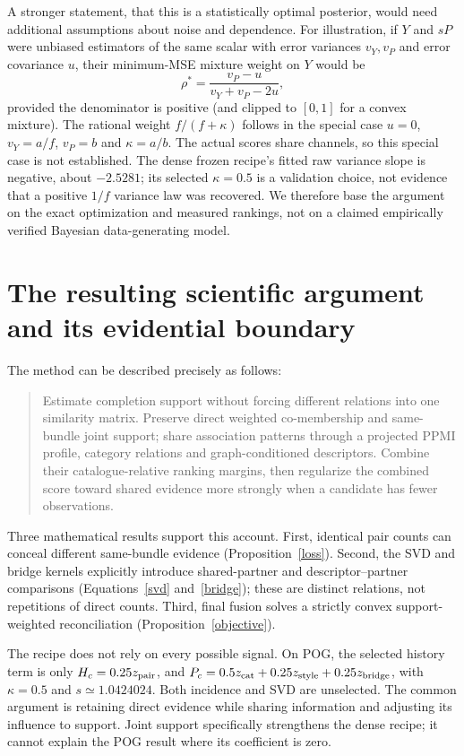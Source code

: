 \documentclass[11pt,a4paper]{article}
\begin{document}
A stronger statement, that this is a statistically optimal posterior, would need
additional assumptions about noise and dependence. For illustration, if $Y$ and
$sP$ were unbiased estimators of the same scalar with error variances $v_Y,v_P$
and error covariance $u$, their minimum-MSE mixture weight on $Y$ would be
\begin{equation}
 \rho^*=\frac{v_P-u}{v_Y+v_P-2u},
\end{equation}
provided the denominator is positive (and clipped to $[0,1]$ for a convex mixture).
The rational weight $f/(f+\kappa)$ follows in the special case $u=0$,
$v_Y=a/f$, $v_P=b$ and $\kappa=a/b$. The actual scores share channels, so this
special case is not established. The dense frozen recipe's fitted raw variance
slope is negative, about $-2.5281$; its selected $\kappa=0.5$ is a validation
choice, not evidence that a positive $1/f$ variance law was recovered. We therefore
base the argument on the exact optimization and measured rankings, not on a
claimed empirically verified Bayesian data-generating model.

\section{The resulting scientific argument and its evidential boundary}
The method can be described precisely as follows:
\begin{quote}
Estimate completion support without forcing different relations into one
similarity matrix. Preserve direct weighted co-membership and same-bundle joint
support; share association patterns through a projected PPMI profile, category
relations and graph-conditioned descriptors. Combine their catalogue-relative
ranking margins, then regularize the combined score toward shared evidence more
strongly when a candidate has fewer observations.
\end{quote}
Three mathematical results support this account. First, identical pair counts can
conceal different same-bundle evidence (Proposition~\ref{loss}). Second, the SVD
and bridge kernels explicitly introduce shared-partner and descriptor--partner
comparisons (Equations~\eqref{svd} and~\eqref{bridge}); these are distinct relations,
not repetitions of direct counts. Third, final fusion solves a strictly convex
support-weighted reconciliation (Proposition~\ref{objective}).

The recipe does not rely on every possible signal. On POG, the selected history
term is only $H_c=0.25z_{\rm pair}$, and
$P_c=0.5z_{\rm cat}+0.25z_{\rm style}+0.25z_{\rm bridge}$, with
$\kappa=0.5$ and $s\simeq1.0424024$. Both incidence and SVD are unselected.
The common argument is retaining direct evidence while sharing information and
adjusting its influence to support. Joint support specifically strengthens the
dense recipe; it cannot explain the POG result where its coefficient is zero.
\end{document}

